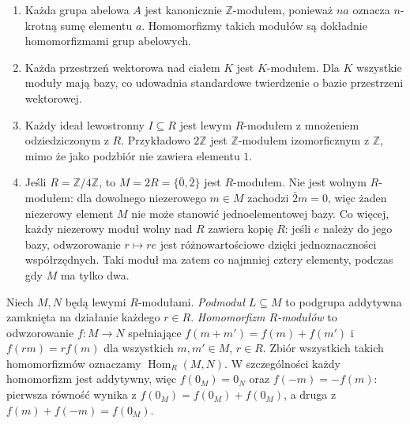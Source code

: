 \begin{przyklad}
\label{aa:prz:modules-four}
\begin{enumerate}[label=\textup{\arabic*)}]
\item Każda grupa abelowa $A$ jest kanonicznie
$\mathbb Z$-modułem, ponieważ $na$ oznacza
$n$-krotną sumę elementu $a$. Homomorfizmy takich
modułów są dokładnie homomorfizmami grup abelowych.
\item Każda przestrzeń wektorowa nad ciałem $K$
jest $K$-modułem. Dla $K$ wszystkie moduły mają bazy,
co udowadnia standardowe twierdzenie o bazie
przestrzeni wektorowej.
\item Każdy ideał lewostronny $I\subseteq R$ jest
lewym $R$-modułem z mnożeniem odziedziczonym z $R$.
Przykładowo $2\mathbb Z$ jest $\mathbb Z$-modułem
izomorficznym z $\mathbb Z$, mimo że jako podzbiór
nie zawiera elementu $1$.
\item Jeśli $R=\mathbb Z/4\mathbb Z$, to
$M=2R=\{\bar0,\bar2\}$ jest $R$-modułem.
Nie jest wolnym $R$-modułem: dla dowolnego
niezerowego $m\in M$ zachodzi $\bar2m=0$,
więc żaden niezerowy element $M$ nie może stanowić
jednoelementowej bazy. Co więcej, każdy niezerowy
moduł wolny nad $R$ zawiera kopię $R$: jeśli $e$
należy do jego bazy, odwzorowanie $r\mapsto re$ jest
różnowartościowe dzięki jednoznaczności współrzędnych.
Taki moduł ma zatem co najmniej cztery elementy,
podczas gdy $M$ ma tylko dwa.
\end{enumerate}
\end{przyklad}

\begin{definicja}
\label{aa:def:modules-sub-hom}
Niech $M,N$ będą lewymi $R$-modułami.
\emph{Podmoduł} $L\subseteq M$ to podgrupa addytywna
zamknięta na działanie każdego $r\in R$.
\emph{Homomorfizm $R$-modułów} to odwzorowanie
$f:M\to N$ spełniające $f(m+m')=f(m)+f(m')$
i $f(rm)=rf(m)$ dla wszystkich $m,m'\in M$, $r\in R$.
Zbiór wszystkich takich homomorfizmów oznaczamy
$\operatorname{Hom}_R(M,N)$. W szczególności każdy homomorfizm
jest addytywny, więc $f(0_M)=0_N$ oraz $f(-m)=-f(m)$:
pierwsza równość wynika z $f(0_M)=f(0_M)+f(0_M)$,
a druga z $f(m)+f(-m)=f(0_M)$.
\end{definicja}

